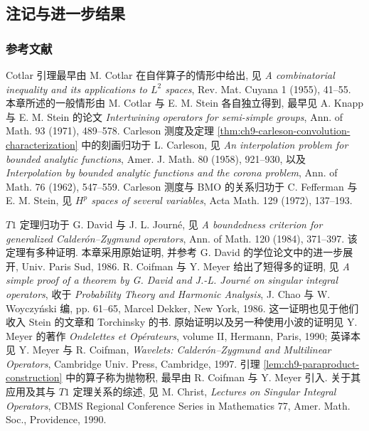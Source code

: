 \subsection{注记与进一步结果}
\label{sec:ch9-notes-further-results}

\subsubsection{参考文献}
\label{subsec:ch9-references}

Cotlar 引理最早由 M. Cotlar 在自伴算子的情形中给出, 见 
\emph{A combinatorial inequality and its applications to $L^2$ spaces}, Rev. Mat. Cuyana 1 (1955), 41--55. 本章所述的一般情形由 M. Cotlar 与 E. M. Stein 各自独立得到, 最早见 A. Knapp 与 E. M. Stein 的论文 
\emph{Intertwining operators for semi-simple groups}, Ann. of Math. 93 (1971), 489--578. Carleson 测度及定理 \ref{thm:ch9-carleson-convolution-characterization} 中的刻画归功于 L. Carleson, 见 
\emph{An interpolation problem for bounded analytic functions}, Amer. J. Math. 80 (1958), 921--930, 以及 
\emph{Interpolation by bounded analytic functions and the corona problem}, Ann. of Math. 76 (1962), 547--559. Carleson 测度与 BMO 的关系归功于 C. Fefferman 与 E. M. Stein, 见 
\emph{$H^p$ spaces of several variables}, Acta Math. 129 (1972), 137--193.

$T1$ 定理归功于 G. David 与 J. L. Journé, 见 
\emph{A boundedness criterion for generalized Calderón--Zygmund operators}, Ann. of Math. 120 (1984), 371--397. 该定理有多种证明. 本章采用原始证明, 并参考 G. David 的学位论文中的进一步展开, Univ. Paris Sud, 1986. R. Coifman 与 Y. Meyer 给出了短得多的证明, 见 
\emph{A simple proof of a theorem by G. David and J.-L. Journé on singular integral operators}, 收于 \emph{Probability Theory and Harmonic Analysis}, J. Chao 与 W. Woyczyński 编, pp. 61--65, Marcel Dekker, New York, 1986. 这一证明也见于他们收入 Stein  的文章和 Torchinsky  的书. 原始证明以及另一种使用小波的证明见 Y. Meyer 的著作 \emph{Ondelettes et Opérateurs}, volume II, Hermann, Paris, 1990; 英译本见 Y. Meyer 与 R. Coifman, \emph{Wavelets: Calderón--Zygmund and Multilinear Operators}, Cambridge Univ. Press, Cambridge, 1997. 引理 \ref{lem:ch9-paraproduct-construction} 中的算子称为抛物积, 最早由 R. Coifman 与 Y. Meyer  引入. 关于其应用及其与 $T1$ 定理关系的综述, 见 M. Christ, \emph{Lectures on Singular Integral Operators}, CBMS Regional Conference Series in Mathematics 77, Amer. Math. Soc., Providence, 1990.

